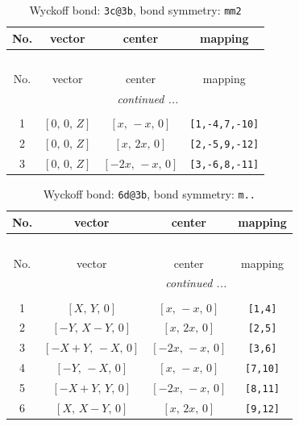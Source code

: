 \documentclass[fleqn,8pt]{jsarticle}
\begin{document}
\renewcommand{\arraystretch}{1.2}
\begin{longtable}{cccc}
\caption{Wyckoff bond: {\tt 3c@3b}, bond symmetry: {\tt mm2}}
 \\
 \hline \hline
No. & vector & center & mapping \\ \hline \endfirsthead

\multicolumn{3}{l}{\tablename\ \thetable{}} \\
 \hline \hline
No. & vector & center & mapping \\ \hline \endhead

 \hline \hline
\multicolumn{3}{r}{\footnotesize\it continued ...} \\ \endfoot

 \hline \hline
\multicolumn{3}{r}{} \\ \endlastfoot

1 & $\left[ 0,\, 0,\, Z \right]$ & $\left[ x,\, - x,\, 0 \right]$ & {\tt [1,-4,7,-10]} \\ \hline
2 & $\left[ 0,\, 0,\, Z \right]$ & $\left[ x,\, 2 x,\, 0 \right]$ & {\tt [2,-5,9,-12]} \\ \hline
3 & $\left[ 0,\, 0,\, Z \right]$ & $\left[ - 2 x,\, - x,\, 0 \right]$ & {\tt [3,-6,8,-11]} \\
\end{longtable}
\renewcommand{\arraystretch}{1.2}
\begin{longtable}{cccc}
\caption{Wyckoff bond: {\tt 6d@3b}, bond symmetry: {\tt m..}}
 \\
 \hline \hline
No. & vector & center & mapping \\ \hline \endfirsthead

\multicolumn{3}{l}{\tablename\ \thetable{}} \\
 \hline \hline
No. & vector & center & mapping \\ \hline \endhead

 \hline \hline
\multicolumn{3}{r}{\footnotesize\it continued ...} \\ \endfoot

 \hline \hline
\multicolumn{3}{r}{} \\ \endlastfoot

1 & $\left[ X,\, Y,\, 0 \right]$ & $\left[ x,\, - x,\, 0 \right]$ & {\tt [1,4]} \\ \hline
2 & $\left[ - Y,\, X - Y,\, 0 \right]$ & $\left[ x,\, 2 x,\, 0 \right]$ & {\tt [2,5]} \\ \hline
3 & $\left[ - X + Y,\, - X,\, 0 \right]$ & $\left[ - 2 x,\, - x,\, 0 \right]$ & {\tt [3,6]} \\ \hline
4 & $\left[ - Y,\, - X,\, 0 \right]$ & $\left[ x,\, - x,\, 0 \right]$ & {\tt [7,10]} \\ \hline
5 & $\left[ - X + Y,\, Y,\, 0 \right]$ & $\left[ - 2 x,\, - x,\, 0 \right]$ & {\tt [8,11]} \\ \hline
6 & $\left[ X,\, X - Y,\, 0 \right]$ & $\left[ x,\, 2 x,\, 0 \right]$ & {\tt [9,12]} \\
\end{longtable}
\end{document}
